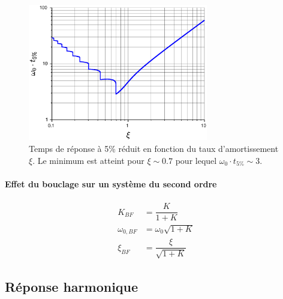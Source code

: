 \begin{figure}
\centering
\includegraphics[width=0.7\textwidth]{fig/fig_temps_de_reduit.eps}
\caption{Temps de réponse à 5\% réduit en fonction du taux 
         d'amortissement $\xi$. Le minimum est atteint pour $\xi\sim0.7$ 
         pour lequel $\omega_0\cdot t_{5\%}\sim3$.
	 \label{fig-2nd_temps_reponse_2}}
\end{figure}

\paragraph{Effet du bouclage sur un système du second ordre}
\begin{align*}
       K_{BF}&=\dfrac{K}{1+K}\\
    \omega_{0,BF}&=\omega_0\sqrt{1+K}\\
    \xi_{BF}&=\dfrac{\xi}{\sqrt{1+K}}
\end{align*}

\subsection{Réponse harmonique}

